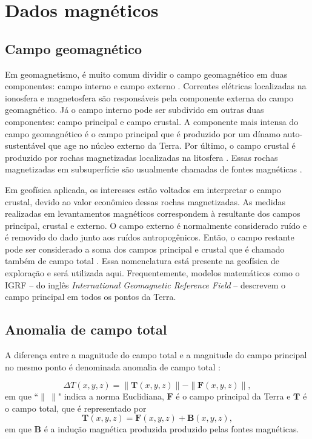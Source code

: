 \chapter{Dados magnéticos}

\section{Campo geomagnético}

Em geomagnetismo, é muito comum dividir o campo geomagnético em duas componentes: campo interno e campo externo \citep{treatise2007}. Correntes elétricas localizadas na ionosfera e magnetosfera são responsáveis pela componente externa do campo geomagnético. Já o campo interno pode ser subdivido em outras duas componentes: campo principal e campo crustal. A componente mais intensa do campo geomagnético é o campo principal que é produzido por um dínamo auto-sustentável que age no núcleo externo da Terra. Por último, o campo crustal é produzido por rochas magnetizadas localizadas na litosfera \citep{langel-hinze1998, treatise2007}. Essas rochas magnetizadas em subsuperfície são usualmente chamadas de fontes magnéticas \citep{blakely1996, nabighian-etal2005-mag}.

Em geofísica aplicada, os interesses estão voltados em interpretar o campo crustal, devido ao valor econômico dessas rochas magnetizadas. As medidas realizadas em levantamentos magnéticos correspondem à resultante dos campos principal, crustal e externo. O campo externo é normalmente considerado ruído e é removido do dado junto aos ruídos antropogênicos. Então, o campo restante pode ser considerado a soma dos campos principal e crustal \citep{treatise2007} que é chamado também de campo total \citep{blakely1996}. Essa nomenclatura está presente na geofísica de exploração e será utilizada aqui. Frequentemente, modelos matemáticos como o IGRF -- do inglês \textit{International Geomagnetic Reference Field} -- descrevem o campo principal em todos os pontos da Terra.

\section{Anomalia de campo total}

A diferença entre a magnitude do campo total e a magnitude do campo principal no mesmo ponto é denominada anomalia de campo total \citep{blakely1996, nabighian-etal2005-mag}:

\begin{equation}\label{eq:anomtotal}
\Delta T(x, y, z) = \|\mathbf{T}(x, y, z)\| - \| \mathbf{F}(x, y, z)\|,
\end{equation}
em que ``$\| \: \|$" indica a norma Euclidiana, $\mathbf{F}$ é o campo principal da Terra e $\mathbf{T}$ é o campo total, que é representado por
\begin{equation}\label{eq:camptotal}
\mathbf{T}(x, y, z) = \mathbf{F}(x, y, z) + \mathbf{B}(x, y, z) ,
\end{equation}
em que $\mathbf{B}$ é a indução magnética produzida produzido pelas fontes magnéticas.


